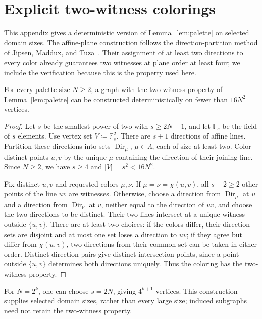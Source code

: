 \section{Explicit two-witness colorings}\label{app:explicit}
This appendix gives a deterministic version of Lemma~\ref{lem:palette} on
selected domain sizes. The affine-plane construction follows the
direction-partition method of Jipsen, Maddux, and
Tuza~\citep{jipsen-maddux-tuza1995}. Their assignment of at least two
directions to every color already guarantees two witnesses at plane
order at least four; we include the verification because this is the
property used here.

\begin{proposition}\label{prop:explicit-graphs}
For every palette size $N\ge2$, a graph with the two-witness property
of Lemma~\ref{lem:palette} can be constructed deterministically on fewer
than $16N^2$ vertices.
\end{proposition}
\begin{proof}
Let $s$ be the smallest power of two with $s\ge2N-1$, and let
$\mathbb F_s$ be the field of $s$ elements. Use vertex set $V\coloneqq\mathbb F_s^2$.
There are $s+1$ directions of affine lines. Partition these directions
into sets $\operatorname{Dir}_\mu$, $\mu\in\Lambda$, each of size at least
two. Color distinct points $u,v$ by the unique $\mu$ containing the
direction of their joining line. Since $N\ge2$, we have $s\ge4$ and
$|V|=s^2<16N^2$.

Fix distinct $u,v$ and requested colors $\mu,\nu$.
If $\mu=\nu=\chi(u,v)$, all $s-2\ge2$ other points of the line $uv$
are witnesses. Otherwise, choose a direction from
$\operatorname{Dir}_\mu$ at $u$ and a direction from
$\operatorname{Dir}_\nu$ at $v$, neither equal to the direction of $uv$,
and choose the two directions to be distinct. Their two lines intersect
at a unique witness outside $\{u,v\}$. There are at least two choices:
if the colors differ, their direction sets are disjoint and at most one
set loses a direction to $uv$; if they agree but differ from $\chi(u,v)$,
two directions from their common set can be taken in either order.
Distinct direction pairs give distinct intersection points, since a
point outside $\{u,v\}$ determines both directions uniquely. Thus the
coloring has the two-witness property.
\end{proof}
For $N=2^k$, one can choose $s=2N$, giving $4^{k+1}$ vertices.
This construction supplies selected domain sizes, rather than every large
size; induced subgraphs need not retain the two-witness property.

